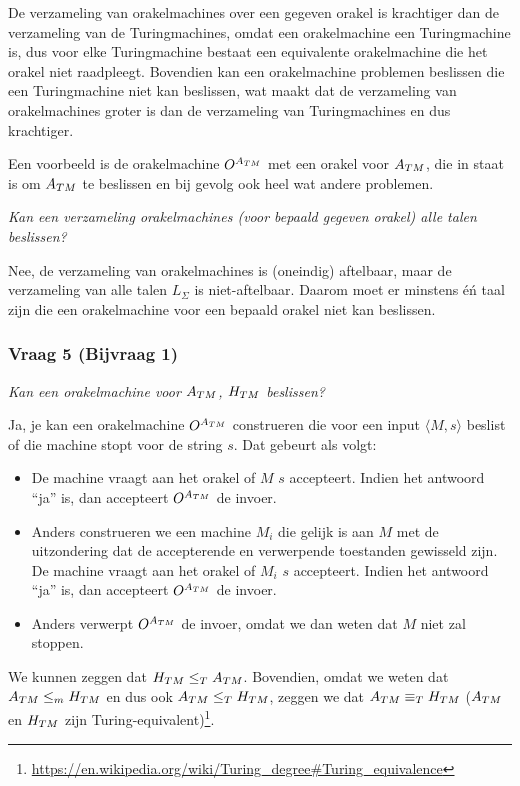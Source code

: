 De verzameling van orakelmachines over een gegeven orakel is krachtiger dan de verzameling van de Turingmachines, omdat een orakelmachine een Turingmachine is, dus voor elke Turingmachine bestaat een equivalente orakelmachine die het orakel niet raadpleegt. Bovendien kan een orakelmachine problemen beslissen die een Turingmachine niet kan beslissen, wat maakt dat de verzameling van orakelmachines groter is dan de verzameling van Turingmachines en dus krachtiger.

Een voorbeeld is de orakelmachine ${O^{{A_{TM}}}}$ met een orakel voor ${A_{TM}}$, die in staat is om ${A_{TM}}$ te beslissen en bij gevolg ook heel wat andere problemen.

\textit{Kan een verzameling orakelmachines (voor bepaald gegeven orakel) alle talen beslissen?}

Nee, de verzameling van orakelmachines is (oneindig) aftelbaar, maar de verzameling van alle talen $L_\Sigma$ is niet-aftelbaar. Daarom moet er minstens \'e\'n taal zijn die een orakelmachine voor een bepaald orakel niet kan beslissen.

\subsubsection{Vraag 5 (Bijvraag 1)}

\textit{Kan een orakelmachine voor ${A_{TM}}$, ${H_{TM}}$ beslissen?}

Ja, je kan een orakelmachine ${O^{{A_{TM}}}}$ construeren die voor een input $\langle M,s \rangle$ beslist of die machine stopt voor de string $s$. Dat gebeurt als volgt:

\begin{itemize}
\item De machine vraagt aan het orakel of $M$ $s$ accepteert. Indien het antwoord ``ja'' is, dan accepteert ${O^{{A_{TM}}}}$ de invoer.
\item Anders construeren we een machine $M_i$ die gelijk is aan $M$ met de uitzondering dat de accepterende en verwerpende toestanden gewisseld zijn. De machine vraagt aan het orakel of $M_i$ $s$ accepteert. Indien het antwoord ``ja'' is, dan accepteert ${O^{{A_{TM}}}}$ de invoer.
\item Anders verwerpt ${O^{{A_{TM}}}}$ de invoer, omdat we dan weten dat $M$ niet zal stoppen.
\end{itemize}

We kunnen zeggen dat ${H_{TM}} \leq_T {A_{TM}}$. Bovendien, omdat we weten dat ${A_{TM}} \leq_m {H_{TM}}$ en dus ook ${A_{TM}} \leq_T {H_{TM}}$, zeggen we dat ${A_{TM}} \equiv_T {H_{TM}}$ (${A_{TM}}$ en ${H_{TM}}$ zijn Turing-equivalent)\footnote{\url{https://en.wikipedia.org/wiki/Turing_degree\#Turing_equivalence}}.

